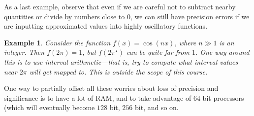 \documentclass[12pt,reqno]{amsart}
\numberwithin{equation}{section}  %
\newtheorem*{example}{Example}
\begin{document}
As a last example, observe that even if we are careful not to subtract nearby
quantities or divide by numbers close to $0$, we can still have precision errors
if we are inputting approximated values into highly oscillatory functions.
\begin{example}
Consider the function $f(x) = \cos(nx)$, where $n \gg 1$ is an integer.
Then $f(2\pi) = 1$, but $f(2 \pi^\star)$ can be quite far from $1$.
One way around this is to use interval arithmetic---that is, try to
compute what interval values near $2 \pi$ will get mapped to. This is
outside the scope of this course.
\end{example}
One way to partially offset all these worries about loss of precision
and significance is to have a lot of RAM, and to take advantage
of $64$ bit processors (which will eventually become $128$ bit, $256$ bit,
and so on.
\end{document}

